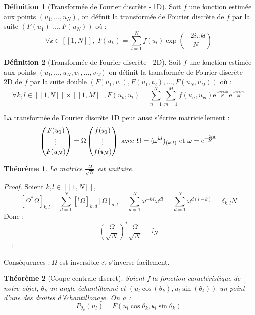 \documentclass{article}
\newcommand*{\iintervalle}[2]{[\![#1,#2]\!]}
\theoremstyle{definition}
\newtheorem{definition}{Définition}
\theoremstyle{remark}
\theoremstyle{plain}
\newtheorem{theorem}{Théorème}
\theoremstyle{definition}
\begin{document}
\begin{definition}[Transformée de Fourier discrète - 1D]
    Soit $f$ une fonction estimée aux points $(u_1, ... , u_N)$, on définit la transformée de Fourier discrète de $f$ par la suite $(F(u_1), ... , F(u_N))$
    où : $$\forall k \in \iintervalle{1}{N}, \; F(u_k) = \sum_{l = 1}^N f(u_l)\exp\left(\frac{-2i\pi k l}{N}\right)$$
\end{definition}
\begin{definition}[Transformée de Fourier discrète - 2D]
    Soit $f$ une fonction estimée aux points $(u_1, ... , u_N, v_1, ... , v_M)$ on définit la transformée de Fourier discrète 2D de $f$ par la suite double $(F(u_1, v_1), F(u_1, v_2), ... , F(u_N,v_M))$ où : 
    $$\forall k, l \in \iintervalle{1}{N} \times \iintervalle{1}{M}, F(u_k, u_l) = \sum_{n = 1}^N \sum_{m = 1}^M f(u_n,u_m) \mathrm{e}^{\frac{-2i \pi k n}{N}} \mathrm{e}^{\frac{-2i \pi l m}{M}} $$
\end{definition}
\noindent La transformée de Fourier discrète 1D peut aussi s'écrire matriciellement : 
    $$\begin{pmatrix}
        F(u_1) \\
        \vdots \\
        F(u_N)
    \end{pmatrix} =
        \Omega
        \begin{pmatrix}
            f(u_1) \\ \vdots \\ f(u_N)
        \end{pmatrix}\\
        \text{ avec } \Omega = (\omega^{kl})_{(k,l)} \text{ et } \omega = \mathrm{e}^{\frac{-2i\pi}{N}}$$
\begin{theorem}
    La matrice $\frac{\Omega}{\sqrt{N}}$ est unitaire.  
\end{theorem}
\begin{proof}
    $ \text{Soient } k,l \in \iintervalle{1}{N}$, 
    $$[\Omega^* \Omega]_{k,l} = \sum_{d = 1}^N [^t\overline{\Omega}]_{k,d} [\Omega]_{d,l} = \sum_{d = 1}^N \omega^{-kd} \omega^{dl} = \sum_{d= 1}^N \omega^{d(l-k)} = \delta_{k,l}N$$
    Donc : $$\left(\frac{\Omega}{\sqrt{N}}\right)^* \frac{\Omega}{\sqrt{N}} = I_N$$
\end{proof}
\noindent Conséquences : $\Omega$ est inversible et s'inverse facilement.
\begin{theorem}[Coupe centrale discret]
Soient $f$ la fonction caractéristique de notre objet, $\theta_k$ un angle échantillonné et $(u_l \cos(\theta_k), u_l \sin(\theta_k))$ un point d'une des droites d'échantillonage. On a : 
$$P_{\theta_k}(u_l) = F(u_l \cos \theta_k, u_l \sin \theta_k)$$
\end{theorem}
\end{document}
